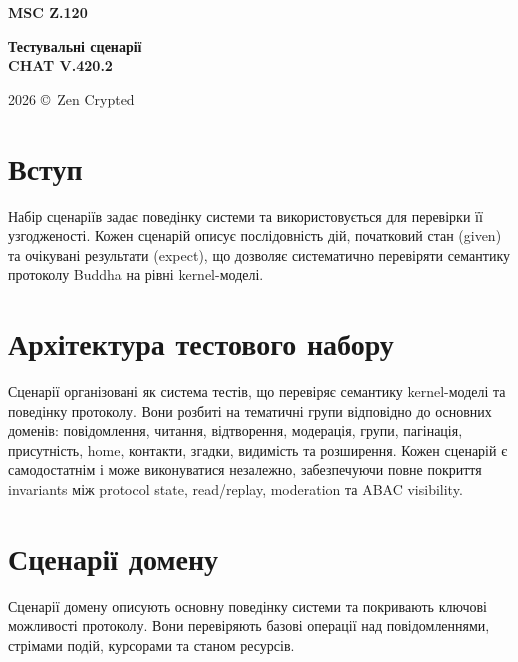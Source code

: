 \documentclass{article}
\newcommand\HUGE[1]{\fontsize{40}{40}\selectfont #1}
\begin{document}
\pagestyle{fancy}

\begin{titlepage}
  \AddToShipoutPictureBG*{\AtPageLowerLeft{\color{nato}\rule{\paperwidth}{\paperheight}}}
  \color{white}\thispagestyle{empty}\vspace*{4cm}\centering
  {\Huge  \textbf{MSC Z.120} \par} \vspace{2cm}
  {\HUGE  \textbf{Тестувальні сценарії \\ CHAT V.420.2} \par} \vspace{2.5cm}
  \vfill
  {\large 2026 \copyright\ Zen Crypted \par}
\end{titlepage}

\newpage

\tableofcontents

\vspace{3cm}

\section{Вступ}

Набір сценаріїв задає поведінку системи та використовується для перевірки її узгодженості. Кожен сценарій описує послідовність дій, початковий стан (given) та очікувані результати (expect), що дозволяє систематично перевіряти семантику протоколу Buddha на рівні kernel-моделі.

\section{Архітектура тестового набору}

Сценарії організовані як система тестів, що перевіряє семантику kernel-моделі та поведінку протоколу. Вони розбиті на тематичні групи відповідно до основних доменів: повідомлення, читання, відтворення, модерація, групи, пагінація, присутність, home, контакти, згадки, видимість та розширення. Кожен сценарій є самодостатнім і може виконуватися незалежно, забезпечуючи повне покриття invariants між protocol state, read/replay, moderation та ABAC visibility.

\section{Сценарії домену}

Сценарії домену описують основну поведінку системи та покривають ключові можливості протоколу. Вони перевіряють базові операції над повідомленнями, стрімами подій, курсорами та станом ресурсів.
\end{document}
